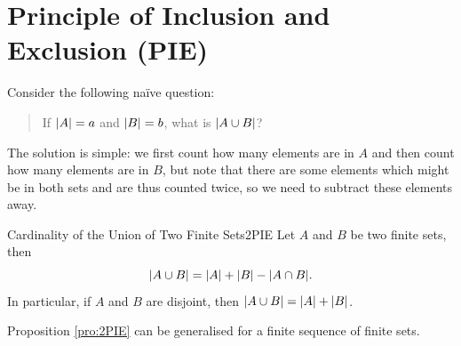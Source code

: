 \documentclass[math]{amznotes}
\theoremstyle{remark}
\begin{document}
\section{Principle of Inclusion and Exclusion (PIE)}
Consider the following naïve question:
\begin{quote}
    If ${\left\lvert {A} \right\rvert} = a$ and ${\left\lvert {B} \right\rvert} = b$, what is ${\left\lvert {A \cup B} \right\rvert}$?
\end{quote}
The solution is simple: we first count how many elements are in $A$ and then count how many elements are in $B$, but note that there are some elements which might be in both sets and are thus counted twice, so we need to subtract these elements away.
\begin{probox}{Cardinality of the Union of Two Finite Sets}{2PIE}
    Let $A$ and $B$ be two finite sets, then
    \begin{equation*}
        {\left\lvert {A \cup B} \right\rvert} = {\left\lvert {A} \right\rvert} + {\left\lvert {B} \right\rvert} - {\left\lvert {A \cap B} \right\rvert}.
    \end{equation*}
    In particular, if $A$ and $B$ are disjoint, then ${\left\lvert {A \cup B} \right\rvert} = {\left\lvert {A} \right\rvert} + {\left\lvert {B} \right\rvert}$.
\end{probox}
Proposition \ref{pro:2PIE} can be generalised for a finite sequence of finite sets.
\end{document}
